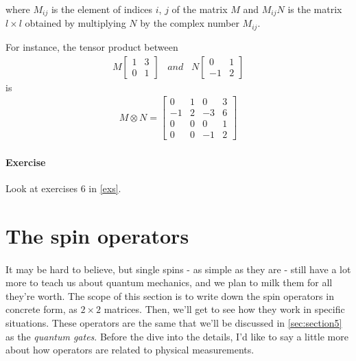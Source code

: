 \documentclass[a4paper,10pt]{article}
\begin{document}
where $M_{ij}$ is the element of indices $i$, $j$ of the matrix $M$ and $M_{ij}N$ is the matrix $l \times l$ obtained by multiplying $N$ by the complex number $M_{ij}$.

For instance, the tensor product between
\begin{equation*}
\begin{aligned}
M {\begin{bmatrix}
1 & 3 \\
0 & 1
\end{bmatrix}} \; \; \; and \; \; \; 
N {\begin{bmatrix}
0 & 1 \\
-1 & 2
\end{bmatrix}}
\end{aligned}
\end{equation*}
is 
\begin{equation*}
\begin{aligned}
M \otimes N = {\begin{bmatrix}
0 & 1 & 0 & 3 \\
-1 & 2 & -3 & 6 \\
0 & 0 & 0 & 1 \\
0 & 0 & -1 & 2
\end{bmatrix}}
\end{aligned}
\end{equation*}

\paragraph{Exercise} Look at exercises 6 in \autoref{exs}.

\newpage

\section{The spin operators}
\paragraph{} It may be hard to believe, but single spins - as simple as they are - still have a lot more to teach us about quantum mechanics, and we plan to milk them for all they're worth. The scope of this section is to write down the spin operators in concrete form, as $2\times 2$ matrices. Then, we'll get to see how they work in specific situations. These operators are the same that we'll be discussed in \autoref{sec:section5} as the \textit{quantum gates}. Before the dive into the details, I'd like to say a little more about how operators are related to physical measurements. 
\end{document}
